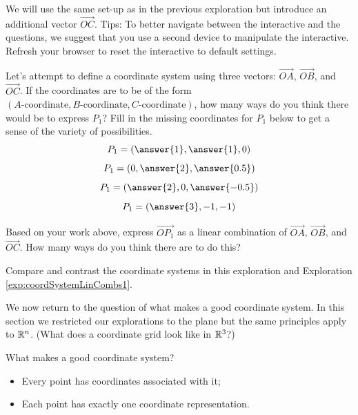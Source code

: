 \documentclass{ximera}
\begin{document}
\begin{exploration}\label{exp:coordSystemLinCombs2}
We will use the same set-up as in the previous exploration but introduce an additional vector $\overrightarrow{OC}$.  Tips: To better navigate between the interactive and the questions, we suggest that you use a second device to manipulate the interactive.  Refresh your browser to reset the interactive to default settings.


 \begin{center}
 \end{center}

 \begin{question}
     Let's attempt to define a coordinate system using three vectors: $\overrightarrow{OA}$, $\overrightarrow{OB}$, and $\overrightarrow{OC}$.  If the coordinates are to be of the form $(A\text{-coordinate}, B\text{-coordinate}, C\text{-coordinate})$, how many ways do you think there would be to express $P_1$? Fill in the missing coordinates for $P_1$ below to get a sense of the variety of possibilities.
     $$P_1=\left(\answer{1},\answer{1},0\right)$$
     $$P_1=\left(0,\answer{2},\answer{0.5}\right)$$
     $$P_1=\left(\answer{2}, 0, \answer{-0.5}\right)$$
     $$P_1=\left(\answer{3},-1,-1\right)$$
 \end{question}

 \begin{question}
     Based on your work above, express $\overrightarrow{OP_1}$ as a linear combination of $\overrightarrow{OA}$, $\overrightarrow{OB}$, and $\overrightarrow{OC}$.  How many ways do you think there are to do this?
 \end{question}

 \begin{question}
     Compare and contrast the coordinate systems in this exploration and Exploration \ref{exp:coordSystemLinCombs1}.  
 \end{question}
    
\end{exploration}

We now return to the question of what makes a good coordinate system.  In this section we restricted our explorations to the plane but the same principles apply to $\mathbb{R}^n$.  (What does a coordinate grid look like in $\mathbb{R}^3$?)

\begin{idea}
    What makes a good coordinate system?
    \begin{itemize}
        \item Every point has coordinates associated with it;
        \item Each point has exactly one coordinate representation.
    \end{itemize}
\end{idea}
\end{document}
